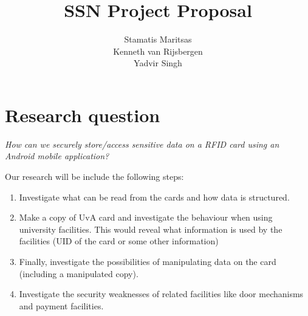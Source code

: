 \documentclass[11pt]{article}
\title{\textbf{SSN Project Proposal}}
\author{Stamatis Maritsas\\
		Kenneth van Rijsbergen\\
		Yadvir Singh}
\date{}
\begin{document}
\maketitle




\section{Research question}

\begin{framed}
\noindent \textit{How can we securely store/access sensitive data on a RFID card using an Android mobile application?}
\end{framed}
Our research will be include the following steps:

\begin{enumerate}
\item{Investigate what can be read from the cards and how data is structured.}
\item{Make a copy of UvA card and investigate the behaviour when using university facilities. This would
reveal what information is used by the facilities (UID of the card or some other information)}
\item{Finally, investigate the possibilities of manipulating data on the card (including a manipulated copy).}
\item{Investigate the security weaknesses of related facilities like door mechanisms and payment facilities.}
\end{enumerate}

\clearpage
\end{document}
